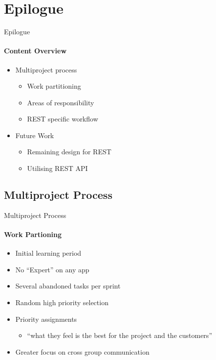 \section{Epilogue}
    \begin{frame}[t]{Epilogue}\framesubtitle{Content Overview}
        \begin{itemize}
            \item Multiproject process
            \begin{itemize}
                \item Work partitioning
                \item Areas of responsibility
                \item REST specific workflow
            \end{itemize}
            \item Future Work
            \begin{itemize}
                \item Remaining design for REST
                \item Utilising REST API
            \end{itemize}
        \end{itemize}
    \end{frame}

    \subsection{Multiproject Process}
    \begin{frame}[t]{Multiproject Process}\framesubtitle{Work Partioning}
        \begin{itemize}
            \item Initial learning period
            \item No ``Expert'' on any app
            \item Several abandoned tasks per sprint
            \item Random high priority selection
            \item Priority assignments
            \begin{itemize}
                \item ``what they feel is the best for the project and the customers''
            \end{itemize}
            \item Greater focus on cross group communication
        \end{itemize}
    \end{frame}


